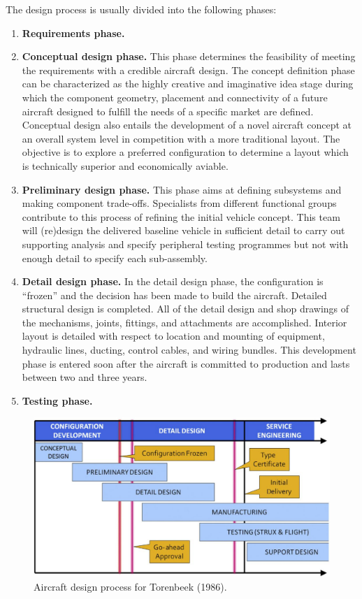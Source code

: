 The design process is usually divided into the following phases:

\begin{enumerate}
\item {\bfseries Requirements phase.}
\item {\bfseries Conceptual design phase.} This phase determines the feasibility of meeting the requirements with a credible aircraft design. The concept definition phase can be characterized as the highly creative and imaginative idea stage during which the component geometry, placement and connectivity of a future aircraft designed to fulfill the needs of a specific market are defined. Conceptual design also entails the development of a novel aircraft concept at an overall system level in competition with a more traditional layout. The objective is to explore a preferred configuration to determine a layout which is technically superior and economically aviable.
\item {\bfseries Preliminary design phase.} This phase aims at defining subsystems and making component trade-offs. Specialists from different functional groups contribute to this process of refining the initial vehicle concept. This team will (re)design the delivered baseline vehicle in sufficient detail to carry out supporting analysis and specify peripheral testing programmes but not with enough detail to specify each sub-assembly.
\item {\bfseries Detail design phase.} In the detail design phase, the configuration is ``frozen'' and the decision has been made to build the aircraft. Detailed structural design is completed. All of the detail design and shop drawings of the mechanisms, joints, fittings, and attachments are accomplished. Interior layout is detailed with respect to location and mounting of equipment, hydraulic lines, ducting, control cables, and wiring bundles. This development phase is entered soon after the aircraft is committed to production and lasts between two and three years.
\item {\bfseries Testing phase.}
\end{enumerate}

\begin{figure}[H]
\centering
\includegraphics[height = 6 cm ]{Immagini/Process_Design_Torenbeek}
\caption{Aircraft design process for Torenbeek (\num{1986}).}
\label{fig:2}
\end{figure}


